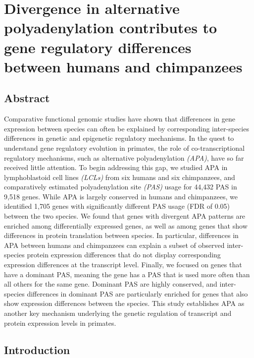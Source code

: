 \chapter{Divergence in alternative polyadenylation contributes to gene regulatory differences between humans and chimpanzees}\label{ch:comp}

\section[Abstract]{Abstract\footnotemark}


Comparative functional genomic studies have shown that differences in gene expression between species can often be explained by corresponding inter-species differences in genetic and epigenetic regulatory mechanisms. In the quest to understand gene regulatory evolution in primates, the role of co-transcriptional regulatory mechanisms, such as alternative polyadenylation \emph{(APA)}, have so far received little attention. To begin addressing this gap, we studied APA in lymphoblastoid cell lines \emph{(LCLs)} from six humans and six chimpanzees, and comparatively estimated polyadenylation site \emph{(PAS)} usage for 44,432 PAS in 9,518 genes. While APA is largely conserved in humans and chimpanzees, we identified 1,705 genes with significantly different PAS usage (FDR of 0.05) between the two species. We found that genes with divergent APA patterns are enriched among differentially expressed genes, as well as among genes that show differences in protein translation between species. In particular, differences in APA between humans and chimpanzees can explain a subset of observed inter-species protein expression differences that do not display corresponding expression differences at the transcript level. Finally, we focused on genes that have a dominant PAS, meaning the gene has a PAS that is used more often than all others for the same gene. Dominant PAS are highly conserved, and inter-species differences in dominant PAS are particularly enriched for genes that also show expression differences between the species. This study establishes APA as another key mechanism underlying the genetic regulation of transcript and protein expression levels in primates.



\section{Introduction}\label{ch03-introduction}



